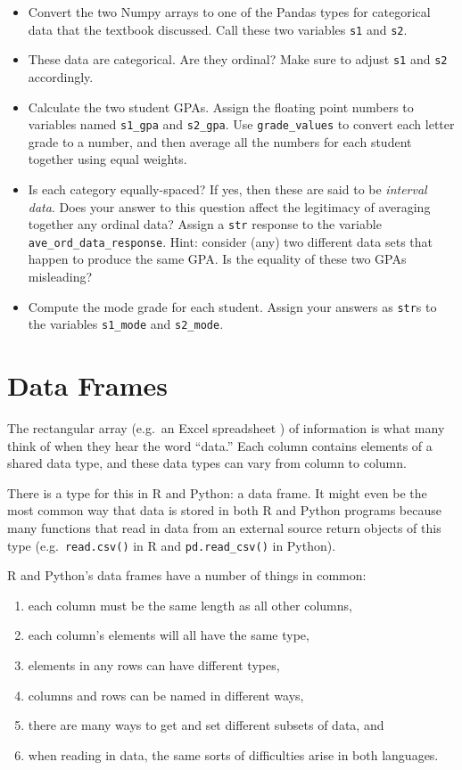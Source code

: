 \documentclass[
  12pt,
]{krantz}
\providecommand{\tightlist}{%
  \setlength{\itemsep}{0pt}\setlength{\parskip}{0pt}}
\begin{document}
\begin{itemize}
\tightlist
\item
  Convert the two Numpy arrays to one of the Pandas types for categorical data that the textbook discussed. Call these two variables \texttt{s1} and \texttt{s2}.
\item
  These data are categorical. Are they ordinal? Make sure to adjust \texttt{s1} and \texttt{s2} accordingly.
\item
  Calculate the two student GPAs. Assign the floating point numbers to variables named \texttt{s1\_gpa} and \texttt{s2\_gpa}. Use \texttt{grade\_values} to convert each letter grade to a number, and then average all the numbers for each student together using equal weights.
\item
  Is each category equally-spaced? If yes, then these are said to be \emph{interval data}. Does your answer to this question affect the legitimacy of averaging together any ordinal data? Assign a \texttt{str} response to the variable \texttt{ave\_ord\_data\_response}. Hint: consider (any) two different data sets that happen to produce the same GPA. Is the equality of these two GPAs misleading?
\item
  Compute the mode grade for each student. Assign your answers as \texttt{str}s to the variables \texttt{s1\_mode} and \texttt{s2\_mode}.
\end{itemize}

\hypertarget{data-frames}{%
\chapter{Data Frames}\label{data-frames}}

The rectangular array (e.g.~an Excel spreadsheet ) of information is what many think of when they hear the word ``data.'' Each column contains elements of a shared data type, and these data types can vary from column to column.

There is a type for this in R and Python: a data frame. It might even be the most common way that data is stored in both R and Python programs because many functions that read in data from an external source return objects of this type (e.g.~\texttt{read.csv()} in R and \texttt{pd.read\_csv()} in Python).

R and Python's data frames have a number of things in common:

\begin{enumerate}
\def\labelenumi{\arabic{enumi}.}
\tightlist
\item
  each column must be the same length as all other columns,
\item
  each column's elements will all have the same type,
\item
  elements in any rows can have different types,
\item
  columns and rows can be named in different ways,
\item
  there are many ways to get and set different subsets of data, and
\item
  when reading in data, the same sorts of difficulties arise in both languages.
\end{enumerate}
\end{document}
